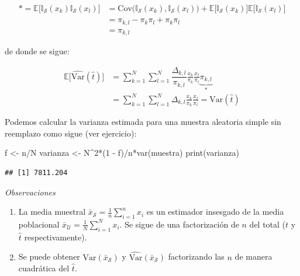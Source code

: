 \documentclass[
]{book}
\newenvironment{Shaded}{\begin{snugshade}}{\end{snugshade}}
\newcommand{\DecValTok}[1]{\textcolor[rgb]{0.00,0.00,0.81}{#1}}
\newcommand{\FunctionTok}[1]{\textcolor[rgb]{0.00,0.00,0.00}{#1}}
\newcommand{\NormalTok}[1]{#1}
\newcommand{\OtherTok}[1]{\textcolor[rgb]{0.56,0.35,0.01}{#1}}
\newcommand{\SpecialCharTok}[1]{\textcolor[rgb]{0.00,0.00,0.00}{#1}}
\begin{document}
\begin{equation}\nonumber
\begin{aligned}
* = \mathbb{E}\bigg[  \mathbb{I}_{\mathcal{S}}(x_k) \mathbb{I}_{\mathcal{S}}(x_l) \bigg] & = \textrm{Cov}\Big( \mathbb{I}_{\mathcal{S}}(x_k), \mathbb{I}_{\mathcal{S}}(x_l) \Big) + \mathbb{E}\Big[ \mathbb{I}_{\mathcal{S}}(x_k)\Big] \mathbb{E}\Big[ \mathbb{I}_{\mathcal{S}}(x_l)\Big] \\ & = \pi_{k,l} - \pi_k \pi_l + \pi_k\pi_l 
\\ & = \pi_{k,l}
\end{aligned}
\end{equation}

de donde se sigue:

\begin{equation}\nonumber
\begin{aligned}
\mathbb{E}\Big[\widehat{\textrm{Var}}(\hat{t})  \Big] & = \sum\limits_{k = 1}^N \sum\limits_{l = 1}^N \dfrac{\Delta_{k,l}}{\pi_{k,l}} \frac{x_k}{\pi_k} \frac{x_l}{\pi_l}\underbrace{ \pi_{k,l}}_{*} 
\\ & = \sum\limits_{k = 1}^N \sum\limits_{l = 1}^N \Delta_{k,l} \frac{x_k}{\pi_k} \frac{x_l}{\pi_l} = \textrm{Var}(\hat{t})
\end{aligned}
\end{equation}

Podemos calcular la varianza estimada para una muestra aleatoria simple sin reemplazo como sigue (ver ejercicio):

\begin{Shaded}
\begin{Highlighting}[]
\NormalTok{f        }\OtherTok{\textless{}{-}}\NormalTok{ n}\SpecialCharTok{/}\NormalTok{N}
\NormalTok{varianza }\OtherTok{\textless{}{-}}\NormalTok{ N}\SpecialCharTok{\^{}}\DecValTok{2}\SpecialCharTok{*}\NormalTok{(}\DecValTok{1} \SpecialCharTok{{-}}\NormalTok{ f)}\SpecialCharTok{/}\NormalTok{n}\SpecialCharTok{*}\FunctionTok{var}\NormalTok{(muestra)}
\FunctionTok{print}\NormalTok{(varianza)}
\end{Highlighting}
\end{Shaded}

\begin{verbatim}
## [1] 7811.204
\end{verbatim}

\emph{Observaciones}

\begin{enumerate}
\def\labelenumi{\arabic{enumi}.}
\item
  La media muestral \(\bar{x}_{\mathcal{S}} = \frac{1}{n}\sum\limits_{i = 1}^{n} x_i\) es un estimador insesgado de la media poblacional \(\bar{x}_{\mathcal{U}} = \frac{1}{N}\sum\limits_{i = 1}^{N} x_i\). Se sigue de una factorización de \(n\) del total (\(t\) y \(\hat{t}\) respectivamente).
\item
  Se puede obtener \(\textrm{Var}(\bar{x}_{\mathcal{S}})\) y \(\widehat{\textrm{Var}}(\bar{x}_{\mathcal{S}})\) factorizando las \(n\) de manera cuadrática del \(\hat{t}\).
\end{enumerate}
\end{document}

